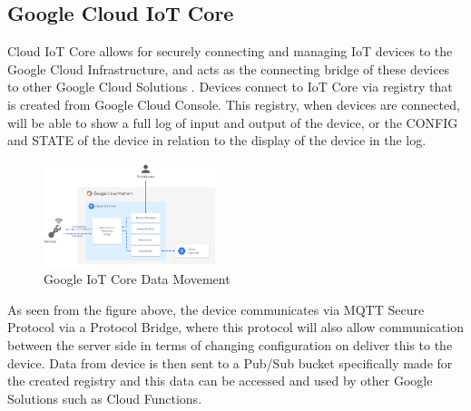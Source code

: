 \documentclass[conference]{IEEEtran}
\begin{document}
\subsection{Google Cloud IoT Core}\label{AA}
Cloud IoT Core allows for securely connecting and managing IoT devices to the Google Cloud Infrastructure, and acts as the connecting bridge of these devices to other Google Cloud Solutions \cite{iotcorewebsite}. Devices connect to IoT Core via registry that 
is created from Google Cloud Console. This registry, when devices are connected, will be able to show a full log of input and output of the device, or the CONFIG and STATE of the device in relation to the display of the device in the log. 
\begin{figure}[htbp]
    \centering
    \includegraphics[width=0.45\textwidth]{iotcorediagram}
    \caption{Google IoT Core Data Movement}
    \label{fig1}
\end{figure}
As seen from the figure above, the device communicates via MQTT Secure Protocol via a Protocol Bridge, where this protocol will also allow communication between the server side in terms of changing configuration on deliver this to the device. 
Data from device is then sent to a Pub/Sub bucket specifically made for the created registry and this data can be accessed and used by other Google Solutions such as Cloud Functions.
\end{document}

